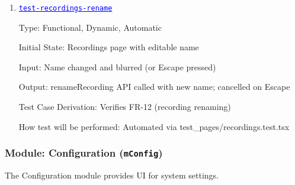 \documentclass[12pt, titlepage]{article}
\newcommand{\mref}[1]{\texttt{#1}}
\newcommand{\tid}[1]{\hyperlink{tid:#1}{\textcolor{blue}{\texttt{#1}}}}
\begin{document}
\begin{enumerate}
        Initial State: Recordings page with sample recording

        Input: Delete button clicked with confirmation

        Output: deleteRecording API called with correct ID

        Test Case Derivation: Verifies FR-12 (recording deletion with confirmation)

        How test will be performed: Automated via test\_pages/recordings.test.tsx

  \item{\tid{test-recordings-rename}\\}

        Type: Functional, Dynamic, Automatic

        Initial State: Recordings page with editable name

        Input: Name changed and blurred (or Escape pressed)

        Output: renameRecording API called with new name; cancelled on Escape

        Test Case Derivation: Verifies FR-12 (recording renaming)

        How test will be performed: Automated via test\_pages/recordings.test.tsx

\end{enumerate}

\subsubsection{Module: Configuration (\mref{mConfig})}

The Configuration module provides UI for system settings.
\end{document}
